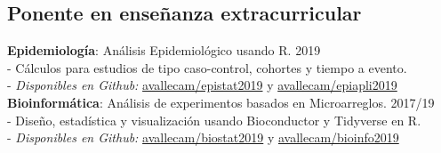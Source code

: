 \documentclass[margin,line]{res}
\begin{document}
\begin{resume}
		\section{\sc Ponente en enseñanza extracurricular}
		{\bf Epidemiología}: Análisis Epidemiológico usando R. \hfill {2019}\\ 
		- Cálculos para estudios de tipo caso-control, cohortes y tiempo a evento. \\
		- \textit{Disponibles en Github:} \href{https://github.com/avallecam/epistat2019}{avallecam/epistat2019} y \href{https://github.com/avallecam/epiapli2019}{avallecam/epiapli2019}\\[4pt] 
		{\bf Bioinformática}: Análisis de experimentos basados en Microarreglos. \hfill {2017/19}\\ 
		- Diseño, estadística y visualización usando Bioconductor y Tidyverse en R. \\
		- \textit{Disponibles en Github:} \href{https://github.com/avallecam/biostat2019}{avallecam/biostat2019} y \href{https://github.com/avallecam/bioinfo2019}{avallecam/bioinfo2019}
		
		
		
		
		

\end{resume}
\end{document}
